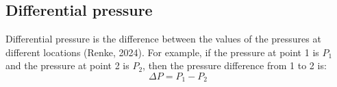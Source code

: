 \documentclass{article}
\newcommand{\wm}[2]{%
	\begin{minipage}{#1\textwidth}
		\centering
		#2
	\end{minipage}%
}
\begin{document}
\begin{center}
\label{representation of pressure}
\end{center}
\subsection{Differential pressure}
Differential pressure is the difference between the values of the pressures at different locations (Renke, 2024). For example, if the pressure at point 1 is $P_1$ and the pressure at point 2 is $P_2$, then the pressure difference from 1 to 2 is: 
\begin{equation}
	\Delta P=P_1-P_2
\end{equation}
\newpage
\end{document}
